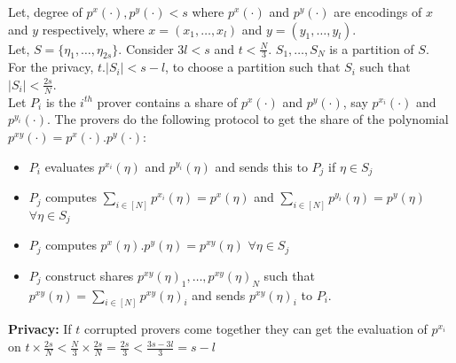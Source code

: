 \documentclass[runningheads]{llncs}
\begin{document}
	Let, degree of $p^x(\cdot), p^y(\cdot) < s$ where $p^x(\cdot)$ and $p^y(\cdot)$ are encodings of $x$ and $y$ respectively, where $x=(x_1,\ldots, x_l)$ and $y=(y_1,\ldots, y_l)$.\\
	Let, $S=\{\eta_1,\ldots, \eta_{2s}\}$.
	Consider $3l<s$ and $t<\frac{N}{3}$.
	$S_1,\ldots, S_N$ is a partition of $S$.\\
	For the privacy, $t.|S_i|<s-l$, to choose a partition such that $S_i$ such that $|S_i|<\frac{2s}{N}$.\\
	Let $P_i$ is the $i^{th}$ prover contains a share of $p^x(\cdot)$ and $p^y(\cdot)$, say $p^{x_i}(\cdot)$ and $p^{y_i}(\cdot)$.
	The provers do the following protocol to get the share of the polynomial $p^{xy}(\cdot)=p^x(\cdot).p^y(\cdot)$:\\
	\begin{itemize}
		\item $P_i$ evaluates $p^{x_i}(\eta)$ and $p^{y_i}(\eta)$ and sends this to $P_j$ if $\eta\in S_j$
		\item $P_j$ computes $\sum\limits_{i\in [N]}p^{x_i}(\eta)=p^x(\eta)$ and $\sum\limits_{i\in [N]}p^{y_i}(\eta)=p^y(\eta)$ $\forall \eta \in S_j$
		\item $P_j$ computes $p^x(\eta).p^y(\eta)=p^{xy}(\eta)$ $\forall \eta \in S_j$
		\item $P_j$ construct shares $p^{xy}(\eta)_1,\ldots, p^{xy}(\eta)_N$ such that $p^{xy}(\eta)=\sum\limits_{i\in [N]} p^{xy}(\eta)_i$ and  sends $p^{xy}(\eta)_i$ to $P_i$.
	\end{itemize}
	\textbf{Privacy:} If $t$ corrupted provers come together they can get the evaluation of $p^{x_i}$ on $t\times \frac{2s}{N}<\frac{N}{3}\times \frac{2s}{N}=\frac{2s}{3}<\frac{3s-3l}{3}=s-l$
\end{document}
